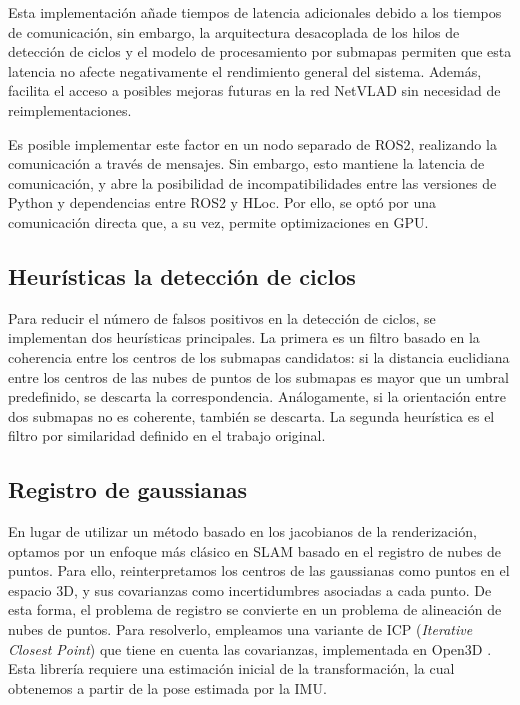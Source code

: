 Esta implementación añade tiempos de latencia adicionales debido a los tiempos de comunicación, sin embargo, la arquitectura desacoplada de los hilos de detección de ciclos y el modelo de procesamiento por submapas permiten que esta latencia no afecte negativamente el rendimiento general del sistema. Además, facilita el acceso a posibles mejoras futuras en la red NetVLAD sin necesidad de reimplementaciones.

Es posible implementar este factor en un nodo separado de ROS2, realizando la comunicación a través de mensajes. Sin embargo, esto mantiene la latencia de comunicación, y abre la posibilidad de incompatibilidades entre las versiones de Python y dependencias entre ROS2 y HLoc. Por ello, se optó por una comunicación directa que, a su vez, permite optimizaciones en GPU.

\subsection{Heurísticas la detección de ciclos}

Para reducir el número de falsos positivos en la detección de ciclos, se implementan dos heurísticas principales. La primera es un filtro basado en la coherencia entre los centros de los submapas candidatos: si la distancia euclidiana entre los centros de las nubes de puntos de los submapas es mayor que un umbral predefinido, se descarta la correspondencia. Análogamente, si la orientación entre dos submapas no es coherente, también se descarta. La segunda heurística es el filtro por similaridad definido en el trabajo original.


\subsection{Registro de gaussianas}

En lugar de utilizar un método basado en los jacobianos de la renderización, optamos por un enfoque más clásico en SLAM basado en el registro de nubes de puntos. Para ello, reinterpretamos los centros de las gaussianas como puntos en el espacio 3D, y sus covarianzas como incertidumbres asociadas a cada punto. De esta forma, el problema de registro se convierte en un problema de alineación de nubes de puntos. Para resolverlo, empleamos una variante de ICP (\textit{Iterative Closest Point}) que tiene en cuenta las covarianzas, implementada en Open3D \cite{zhou2018open3dmodernlibrary3d}. Esta librería requiere una estimación inicial de la transformación, la cual obtenemos a partir de la pose estimada por la IMU.

